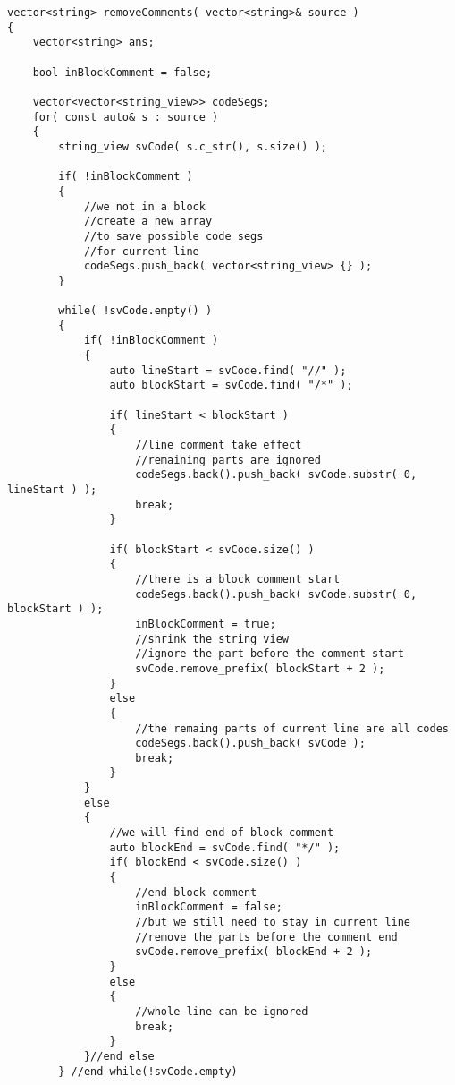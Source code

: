 \setcounter{lstlisting}{0}
\begin{lstlisting}[style=customc, caption={Parse}]
vector<string> removeComments( vector<string>& source )
{
    vector<string> ans;

    bool inBlockComment = false;

    vector<vector<string_view>> codeSegs;
    for( const auto& s : source )
    {
        string_view svCode( s.c_str(), s.size() );

        if( !inBlockComment )
        {
            //we not in a block
            //create a new array
            //to save possible code segs
            //for current line
            codeSegs.push_back( vector<string_view> {} );
        }

        while( !svCode.empty() )
        {
            if( !inBlockComment )
            {
                auto lineStart = svCode.find( "//" );
                auto blockStart = svCode.find( "/*" );

                if( lineStart < blockStart )
                {
                    //line comment take effect
                    //remaining parts are ignored
                    codeSegs.back().push_back( svCode.substr( 0, lineStart ) );
                    break;
                }

                if( blockStart < svCode.size() )
                {
                    //there is a block comment start
                    codeSegs.back().push_back( svCode.substr( 0, blockStart ) );
                    inBlockComment = true;
                    //shrink the string view
                    //ignore the part before the comment start
                    svCode.remove_prefix( blockStart + 2 );
                }
                else
                {
                    //the remaing parts of current line are all codes
                    codeSegs.back().push_back( svCode );
                    break;
                }
            }
            else
            {
                //we will find end of block comment
                auto blockEnd = svCode.find( "*/" );
                if( blockEnd < svCode.size() )
                {
                    //end block comment
                    inBlockComment = false;
                    //but we still need to stay in current line
                    //remove the parts before the comment end
                    svCode.remove_prefix( blockEnd + 2 );
                }
                else
                {
                    //whole line can be ignored
                    break;
                }
            }//end else
        } //end while(!svCode.empty)


\end{lstlisting}
